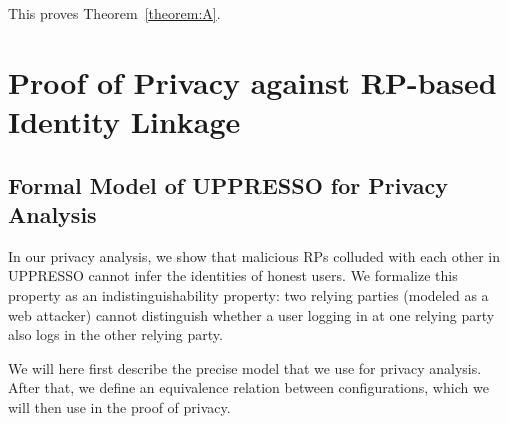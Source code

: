   
  This proves Theorem~\ref{theorem:A}.\QED
  
  \section{Proof of Privacy against RP-based Identity Linkage}
  
  \subsection{Formal Model of UPPRESSO for Privacy Analysis}
  
  In our privacy analysis, we show that malicious RPs colluded 
  with each other in UPPRESSO cannot infer the identities of 
  honest users. We formalize this property as an 
  indistinguishability property: two relying parties (modeled as 
  a web attacker) cannot distinguish whether a user logging in 
  at one relying party also logs in the other relying party.
  
  We will here first describe the precise model that we use for 
  privacy analysis. After that, we define an equivalence 
  relation between configurations, which we will then use in the 
  proof of privacy.
  
